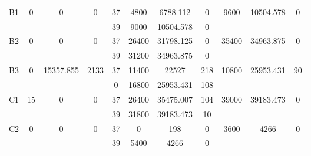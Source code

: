 \begin{sidewaystable}
\begin{tabular}{c||c|c|c||c|c|c|c||c|c|c}
        
      \\
      \hline
      \multirow{2}{*}{B1} &
      \multirow{2}{*}{0} &
      \multirow{2}{*}{0} &
      \multirow{2}{*}{0} &
      37 &
      4800 &
        6788.112 &
        0 &
      \multirow{2}{*}{9600} &
        \multirow{2}{*}{10504.578} &
        \multirow{2}{*}{0}
      \\
      \cline{5-8}
       &
       &
       &
       &
      39 &
      9000 &
        10504.578 &
        0 &
      
         &
        
      \\
      \hline
      \multirow{2}{*}{B2} &
      \multirow{2}{*}{0} &
      \multirow{2}{*}{0} &
      \multirow{2}{*}{0} &
      37 &
      26400 &
        31798.125 &
        0 &
      \multirow{2}{*}{35400} &
        \multirow{2}{*}{34963.875} &
        \multirow{2}{*}{0}
      \\
      \cline{5-8}
       &
       &
       &
       &
      39 &
      31200 &
        34963.875 &
        0 &
      
         &
        
      \\
      \hline
      \multirow{2}{*}{B3} &
      \multirow{2}{*}{0} &
      \multirow{2}{*}{15357.855} &
      \multirow{2}{*}{2133} &
      37 &
      11400 &
        22527 &
        218 &
      \multirow{2}{*}{10800} &
        \multirow{2}{*}{25953.431} &
        \multirow{2}{*}{90}
      \\
      \cline{5-8}
       &
       &
       &
       &
      0 &
      16800 &
        25953.431 &
        108 &
      
         &
        
      \\
      \hline
      \multirow{2}{*}{C1} &
      \multirow{2}{*}{15} &
      \multirow{2}{*}{0} &
      \multirow{2}{*}{0} &
      37 &
      26400 &
        35475.007 &
        104 &
      \multirow{2}{*}{39000} &
        \multirow{2}{*}{39183.473} &
        \multirow{2}{*}{0}
      \\
      \cline{5-8}
       &
       &
       &
       &
      39 &
      31800 &
        39183.473 &
        10 &
      
         &
        
      \\
      \hline
      \multirow{2}{*}{C2} &
      \multirow{2}{*}{0} &
      \multirow{2}{*}{0} &
      \multirow{2}{*}{0} &
      37 &
      0 &
        198 &
        0 &
      \multirow{2}{*}{3600} &
        \multirow{2}{*}{4266} &
        \multirow{2}{*}{0}
      \\
      \cline{5-8}
       &
       &
       &
       &
      39 &
      5400 &
        4266 &
        0 &
      

\end{tabular}
\end{sidewaystable}
